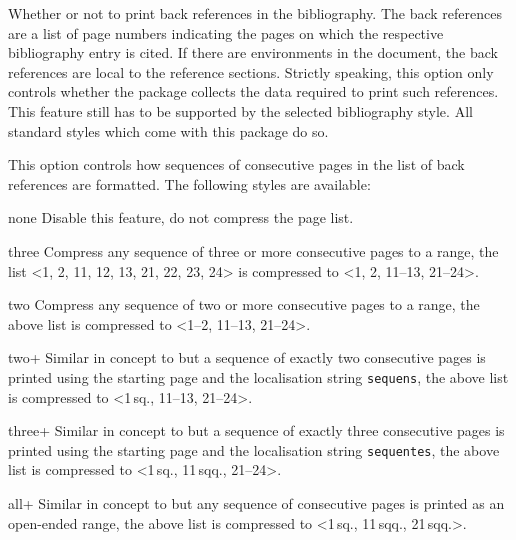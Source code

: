 \documentclass{ltxdockit}[2011/03/25]
\newcommand*{\biblatex}{\sty{biblatex}\xspace}
\begin{document}
\begin{optionlist}

Whether or not to print back references in the bibliography. The back references are a list of page numbers indicating the pages on which the respective bibliography entry is cited. If there are  environments in the document, the back references are local to the reference sections. Strictly speaking, this option only controls whether the \biblatex package collects the data required to print such references. This feature still has to be supported by the selected bibliography style. All standard styles which come with this package do so.


This option controls how sequences of consecutive pages in the list of back references are formatted. The following styles are available:

\begin{valuelist}

\item[none] Disable this feature, \ie do not compress the page list.

\item[three] Compress any sequence of three or more consecutive pages to a range, \eg the list <1, 2, 11, 12, 13, 21, 22, 23, 24> is compressed to <1, 2, 11--13, 21--24>.

\item[two] Compress any sequence of two or more consecutive pages to a range, \eg the above list is compressed to <1--2, 11--13, 21--24>.

\item[two+] Similar in concept to  but a sequence of exactly two consecutive pages is printed using the starting page and the localisation string \texttt{sequens}, \eg the above list is compressed to <1\,sq., 11--13, 21--24>.

\item[three+] Similar in concept to  but a sequence of exactly three consecutive pages is printed using the starting page and the localisation string \texttt{sequentes}, \eg the above list is compressed to <1\,sq., 11\,sqq., 21--24>.

\item[all+] Similar in concept to  but any sequence of consecutive pages is printed as an open-ended range, \eg the above list is compressed to <1\,sq., 11\,sqq., 21\,sqq.>.


\end{valuelist}
\end{optionlist}
\end{document}
